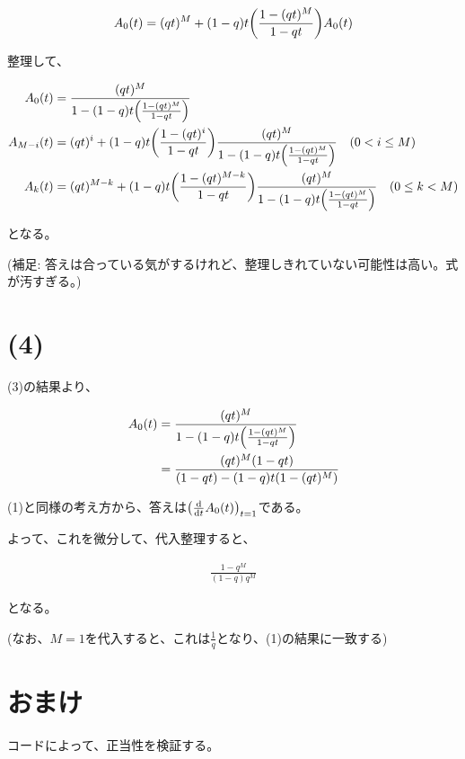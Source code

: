 \documentclass[a4paper, 10pt, dvipdfmx]{jlreq}
\begin{document}
\begin{align*}
    A_0(t)  = (qt)^M+(1-q)t\qty(\frac{1-(qt)^M}{1-qt})A_0(t) \\
\end{align*}

整理して、

\begin{align*}
    A_0(t)     & =\frac{(qt)^M}{1-(1-q)t\qty(\frac{1-(qt)^M}{1-qt})}                                                                      \\
    A_{M-i}(t) & =(qt)^i+(1-q)t\qty(\frac{1-(qt)^i}{1-qt})\frac{(qt)^M}{1-(1-q)t\qty(\frac{1-(qt)^M}{1-qt})} \quad (0 < i \leq M)         \\
    A_{k}(t)   & =(qt)^{M-k}+(1-q)t\qty(\frac{1-(qt)^{M-k}}{1-qt})\frac{(qt)^M}{1-(1-q)t\qty(\frac{1-(qt)^M}{1-qt})} \quad (0 \leq k < M) \\
\end{align*}

となる。

(補足: 答えは合っている気がするけれど、整理しきれていない可能性は高い。式が汚すぎる。)

\section*{(4)}

 (3)の結果より、

\begin{align*}
    A_0(t) & =\frac{(qt)^M}{1-(1-q)t\qty(\frac{1-(qt)^M}{1-qt})} \\
           & =\frac{(qt)^M(1-qt)}{(1-qt)-(1-q)t(1-(qt)^M)}       \\
\end{align*}


(1)と同様の考え方から、答えは$\qty(\dv{t}A_0(t))_{t=1}$である。

よって、これを微分して、代入整理すると、

\begin{align*}
    \frac{1-q^M}{(1-q)q^M}
\end{align*}

となる。

(なお、$M=1$を代入すると、これは$\frac{1}{q}$となり、(1)の結果に一致する)

\section*{おまけ}

コードによって、正当性を検証する。
\end{document}
